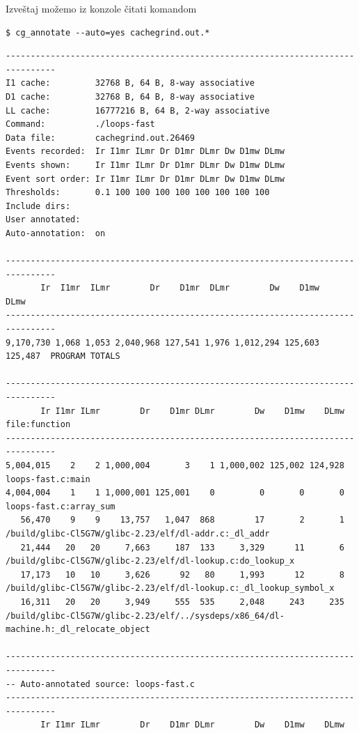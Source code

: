 Izveštaj možemo iz konzole čitati komandom

\begin{verbatim}
$ cg_annotate --auto=yes cachegrind.out.*
\end{verbatim}

\begin{verbatim}
--------------------------------------------------------------------------------
I1 cache:         32768 B, 64 B, 8-way associative
D1 cache:         32768 B, 64 B, 8-way associative
LL cache:         16777216 B, 64 B, 2-way associative
Command:          ./loops-fast
Data file:        cachegrind.out.26469
Events recorded:  Ir I1mr ILmr Dr D1mr DLmr Dw D1mw DLmw
Events shown:     Ir I1mr ILmr Dr D1mr DLmr Dw D1mw DLmw
Event sort order: Ir I1mr ILmr Dr D1mr DLmr Dw D1mw DLmw
Thresholds:       0.1 100 100 100 100 100 100 100 100
Include dirs:
User annotated:
Auto-annotation:  on

--------------------------------------------------------------------------------
       Ir  I1mr  ILmr        Dr    D1mr  DLmr        Dw    D1mw    DLmw
--------------------------------------------------------------------------------
9,170,730 1,068 1,053 2,040,968 127,541 1,976 1,012,294 125,603 125,487  PROGRAM TOTALS

--------------------------------------------------------------------------------
       Ir I1mr ILmr        Dr    D1mr DLmr        Dw    D1mw    DLmw  file:function
--------------------------------------------------------------------------------
5,004,015    2    2 1,000,004       3    1 1,000,002 125,002 124,928  loops-fast.c:main
4,004,004    1    1 1,000,001 125,001    0         0       0       0  loops-fast.c:array_sum
   56,470    9    9    13,757   1,047  868        17       2       1  /build/glibc-Cl5G7W/glibc-2.23/elf/dl-addr.c:_dl_addr
   21,444   20   20     7,663     187  133     3,329      11       6  /build/glibc-Cl5G7W/glibc-2.23/elf/dl-lookup.c:do_lookup_x
   17,173   10   10     3,626      92   80     1,993      12       8  /build/glibc-Cl5G7W/glibc-2.23/elf/dl-lookup.c:_dl_lookup_symbol_x
   16,311   20   20     3,949     555  535     2,048     243     235  /build/glibc-Cl5G7W/glibc-2.23/elf/../sysdeps/x86_64/dl-machine.h:_dl_relocate_object

--------------------------------------------------------------------------------
-- Auto-annotated source: loops-fast.c
--------------------------------------------------------------------------------
       Ir I1mr ILmr        Dr    D1mr DLmr        Dw    D1mw    DLmw


\end{verbatim}
